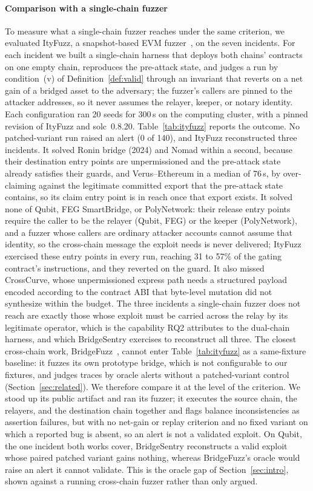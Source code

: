 \documentclass[a4paper]{cas-sc}
\begin{document}
\paragraph{Comparison with a single-chain fuzzer}
To measure what a single-chain fuzzer reaches under the same criterion, we evaluated ItyFuzz, a snapshot-based EVM fuzzer~\citep{shou2023ityfuzz}, on the seven incidents. For each incident we built a single-chain harness that deploys both chains' contracts on one empty chain, reproduces the pre-attack state, and judges a run by condition~(v) of Definition~\ref{def:valid} through an invariant that reverts on a net gain of a bridged asset to the adversary; the fuzzer's callers are pinned to the attacker addresses, so it never assumes the relayer, keeper, or notary identity. Each configuration ran 20 seeds for 300\,s on the computing cluster, with a pinned revision of ItyFuzz and solc~0.8.20. Table~\ref{tab:ityfuzz} reports the outcome. No patched-variant run raised an alert (0 of 140), and ItyFuzz reconstructed three incidents. It solved Ronin bridge (2024) and Nomad within a second, because their destination entry points are unpermissioned and the pre-attack state already satisfies their guards, and Verus--Ethereum in a median of 76\,s, by over-claiming against the legitimate committed export that the pre-attack state contains, so its claim entry point is in reach once that export exists. It solved none of Qubit, FEG SmartBridge, or PolyNetwork: their release entry points require the caller to be the relayer (Qubit, FEG) or the keeper (PolyNetwork), and a fuzzer whose callers are ordinary attacker accounts cannot assume that identity, so the cross-chain message the exploit needs is never delivered; ItyFuzz exercised these entry points in every run, reaching 31 to 57\% of the gating contract's instructions, and they reverted on the guard. It also missed CrossCurve, whose unpermissioned express path needs a structured payload encoded according to the contract ABI that byte-level mutation did not synthesize within the budget. The three incidents a single-chain fuzzer does not reach are exactly those whose exploit must be carried across the relay by its legitimate operator, which is the capability RQ2 attributes to the dual-chain harness, and which BridgeSentry exercises to reconstruct all three. The closest cross-chain work, BridgeFuzz~\citep{winkler2026bridgefuzz}, cannot enter Table~\ref{tab:ityfuzz} as a same-fixture baseline: it fuzzes its own prototype bridge, which is not configurable to our fixtures, and judges traces by oracle alerts without a patched-variant control (Section~\ref{sec:related}). We therefore compare it at the level of the criterion. We stood up its public artifact and ran its fuzzer; it executes the source chain, the relayers, and the destination chain together and flags balance inconsistencies as assertion failures, but with no net-gain or replay criterion and no fixed variant on which a reported bug is absent, so an alert is not a validated exploit. On Qubit, the one incident both works cover, BridgeSentry reconstructs a valid exploit whose paired patched variant gains nothing, whereas BridgeFuzz's oracle would raise an alert it cannot validate. This is the oracle gap of Section~\ref{sec:intro}, shown against a running cross-chain fuzzer rather than only argued.
\end{document}
